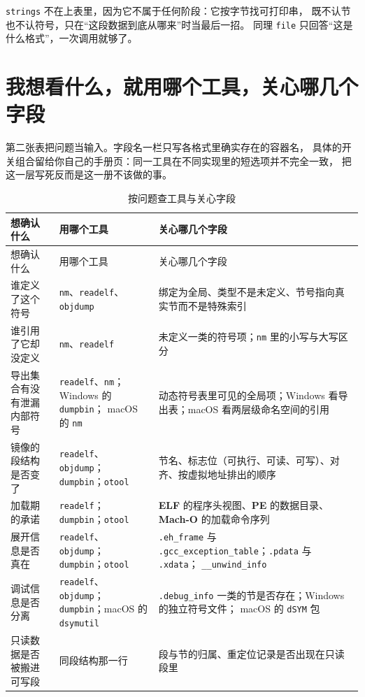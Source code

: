 \documentclass[12pt,a4paper,fontset=fandol]{ctexbook}
\newcommand{\Tp}[1]{\texttt{#1}}
\newcommand{\Tool}[1]{\texttt{#1}}
\newcommand{\Sect}[1]{\texttt{.#1}}
\newcommand{\Elf}{\textbf{\textsf{ELF}}}
\newcommand{\PeFmt}{\textbf{\textsf{PE}}}
\newcommand{\Macho}{\textbf{\textsf{Mach-O}}}
\newcommand{\Win}{\textsf{Windows}}
\newcommand{\Mac}{\textsf{macOS}}
\begin{document}
\Tool{strings} 不在上表里，因为它不属于任何阶段：它按字节找可打印串，
既不认节也不认符号，只在“这段数据到底从哪来”时当最后一招。
同理 \Tool{file} 只回答“这是什么格式”，一次调用就够了。

\section{我想看什么，就用哪个工具，关心哪几个字段}

第二张表把问题当输入。字段名一栏只写各格式里确实存在的容器名，
具体的开关组合留给你自己的手册页：同一工具在不同实现里的短选项并不完全一致，
把这一层写死反而是这一册不该做的事。

\begin{longtable}{@{}>{\raggedright\arraybackslash}p{} >{\raggedright\arraybackslash}p{} >{\raggedright\arraybackslash}p{}@{}}
\caption{按问题查工具与关心字段}\label{tab:apA-goal}\\
\toprule
想确认什么 & 用哪个工具 & 关心哪几个字段 \\
\midrule
\endfirsthead
\toprule
想确认什么 & 用哪个工具 & 关心哪几个字段 \\
\midrule
\endhead
\bottomrule
\endfoot
谁定义了这个符号 & \Tool{nm}、\Tool{readelf}、\Tool{objdump} &
绑定为全局、类型不是未定义、节号指向真实节而不是特殊索引 \\
谁引用了它却没定义 & \Tool{nm}、\Tool{readelf} &
未定义一类的符号项；\Tool{nm}{} 里的小写与大写区分 \\
导出集合有没有泄漏内部符号 & \Tool{readelf}、\Tool{nm}；\Win{} 的 \Tool{dumpbin}；
\Mac{} 的 \Tool{nm} &
动态符号表里可见的全局项；\Win{} 看导出表；\Mac{} 看两层级命名空间的引用 \\
镜像的段结构是否变了 & \Tool{readelf}、\Tool{objdump}；\Tool{dumpbin}；\Tool{otool} &
节名、标志位（可执行、可读、可写）、对齐、按虚拟地址排出的顺序 \\
加载期的承诺 & \Tool{readelf}；\Tool{dumpbin}；\Tool{otool} &
\Elf{} 的程序头视图、\PeFmt{} 的数据目录、\Macho{} 的加载命令序列 \\
展开信息是否真在 & \Tool{readelf}、\Tool{objdump}；\Tool{dumpbin}；\Tool{otool} &
\Sect{eh\_frame} 与 \Sect{gcc\_exception\_table}；\Tp{.pdata} 与 \Tp{.xdata}；
\Tp{\_\_unwind\_info} \\
调试信息是否分离 & \Tool{readelf}、\Tool{objdump}；\Tool{dumpbin}；\Mac{} 的 \Tool{dsymutil} &
\Sect{debug\_info}{} 一类的节是否存在；\Win{} 的独立符号文件；
\Mac{} 的 \Tp{dSYM}{} 包 \\
只读数据是否被搬进可写段 & 同段结构那一行 &
段与节的归属、重定位记录是否出现在只读段里 \\
\end{longtable}
\end{document}
